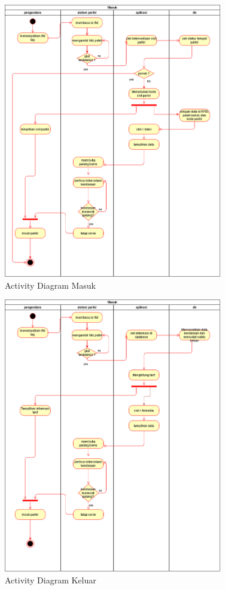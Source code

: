 \begin{figure} [H]
    \includegraphics[width=0.85\textwidth, center]{images/activity diagram skripsi masuk.png}
    \caption{Activity Diagram Masuk}
    \label{fig:diagrammasuk}
\end{figure}

\begin{figure} [H]
    \includegraphics[width=0.85\textwidth, center]{images/activity diagram skripsi keluar.png}
    \caption{Activity Diagram Keluar}
    \label{fig:diagramkeluar}
\end{figure}

